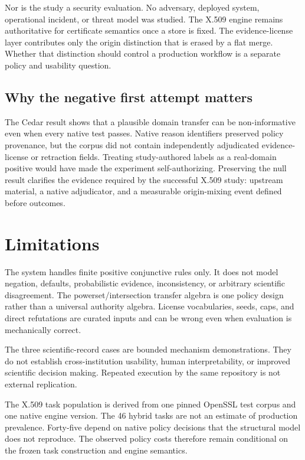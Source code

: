 \documentclass[pdflatex,sn-mathphys-num]{sn-jnl}
\begin{document}
Nor is the study a security evaluation. No adversary, deployed system, operational incident, or threat model was studied. The X.509 engine remains authoritative for certificate semantics once a store is fixed. The evidence-license layer contributes only the origin distinction that is erased by a flat merge. Whether that distinction should control a production workflow is a separate policy and usability question.

\subsection{Why the negative first attempt matters}\label{why-the-negative-first-attempt-matters}

The Cedar result shows that a plausible domain transfer can be non-informative even when every native test passes. Native reason identifiers preserved policy provenance, but the corpus did not contain independently adjudicated evidence-license or retraction fields. Treating study-authored labels as a real-domain positive would have made the experiment self-authorizing. Preserving the null result clarifies the evidence required by the successful X.509 study: upstream material, a native adjudicator, and a measurable origin-mixing event defined before outcomes.

\section{Limitations}\label{limitations}

The system handles finite positive conjunctive rules only. It does not model negation, defaults, probabilistic evidence, inconsistency, or arbitrary scientific disagreement. The powerset/intersection transfer algebra is one policy design rather than a universal authority algebra. License vocabularies, seeds, caps, and direct refutations are curated inputs and can be wrong even when evaluation is mechanically correct.

The three scientific-record cases are bounded mechanism demonstrations. They do not establish cross-institution usability, human interpretability, or improved scientific decision making. Repeated execution by the same repository is not external replication.

The X.509 task population is derived from one pinned OpenSSL test corpus and one native engine version. The 46 hybrid tasks are not an estimate of production prevalence. Forty-five depend on native policy decisions that the structural model does not reproduce. The observed policy costs therefore remain conditional on the frozen task construction and engine semantics.
\end{document}
